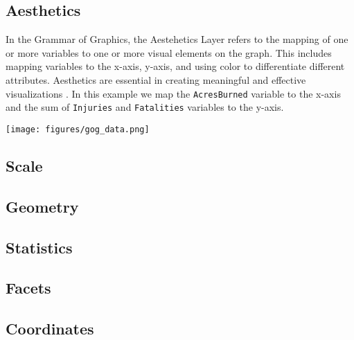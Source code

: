 \subsection*{Aesthetics}
\begin{minipage}[t]{0.6\textwidth}
    \vspace{0pt}
    In the Grammar of Graphics, the Aestehetics Layer refers to the mapping of one or more variables to one or more visual elements on the graph. This includes mapping variables to the x-axis, y-axis, and using color to differentiate different attributes. Aesthetics are essential in creating meaningful and effective visualizations \cite{wilkinsonAesthetics2005}.
    In this example we map the \texttt{AcresBurned} variable to the x-axis and the sum of \texttt{Injuries} and \texttt{Fatalities} variables to the y-axis.
    \hspace{1cm}
\end{minipage}%
\begin{minipage}[t]{0.4\textwidth}
    \vspace{0pt}
    \texttt{[image: figures/gog\_data.png]}
\end{minipage}

\subsection*{Scale}

\subsection*{Geometry}

\subsection*{Statistics}

\subsection*{Facets}

\subsection*{Coordinates}